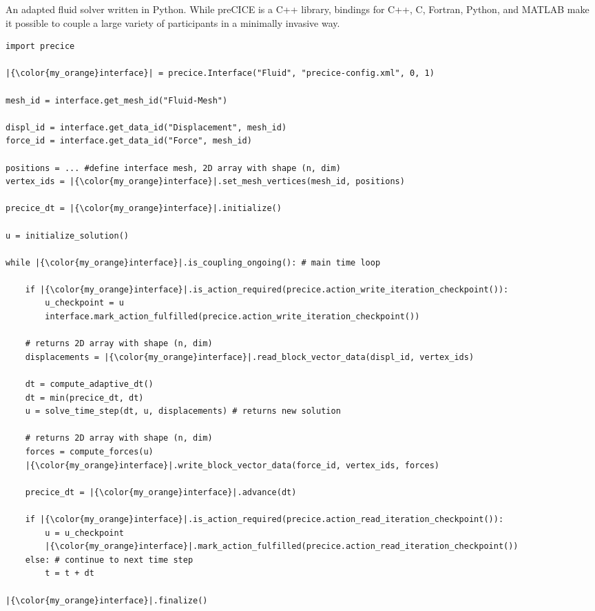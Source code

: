 \begin{listing}[h!]
\caption{An adapted fluid solver written in Python. While preCICE is a C++ library, bindings for C++, C, Fortran, Python, and MATLAB make it possible to couple a large variety of participants in a minimally invasive way.}
\small
\label{code:example}
\begin{verbatim}
import precice

|{\color{my_orange}interface}| = precice.Interface("Fluid", "precice-config.xml", 0, 1)

mesh_id = interface.get_mesh_id("Fluid-Mesh")

displ_id = interface.get_data_id("Displacement", mesh_id)
force_id = interface.get_data_id("Force", mesh_id)

positions = ... #define interface mesh, 2D array with shape (n, dim)
vertex_ids = |{\color{my_orange}interface}|.set_mesh_vertices(mesh_id, positions)

precice_dt = |{\color{my_orange}interface}|.initialize()

u = initialize_solution()

while |{\color{my_orange}interface}|.is_coupling_ongoing(): # main time loop
        
    if |{\color{my_orange}interface}|.is_action_required(precice.action_write_iteration_checkpoint()):
        u_checkpoint = u
        interface.mark_action_fulfilled(precice.action_write_iteration_checkpoint())    

    # returns 2D array with shape (n, dim)
    displacements = |{\color{my_orange}interface}|.read_block_vector_data(displ_id, vertex_ids)

    dt = compute_adaptive_dt() 
    dt = min(precice_dt, dt)
    u = solve_time_step(dt, u, displacements) # returns new solution
    
    # returns 2D array with shape (n, dim)
    forces = compute_forces(u) 
    |{\color{my_orange}interface}|.write_block_vector_data(force_id, vertex_ids, forces)
    
    precice_dt = |{\color{my_orange}interface}|.advance(dt)

    if |{\color{my_orange}interface}|.is_action_required(precice.action_read_iteration_checkpoint()):
        u = u_checkpoint
        |{\color{my_orange}interface}|.mark_action_fulfilled(precice.action_read_iteration_checkpoint())
    else: # continue to next time step 
        t = t + dt    

|{\color{my_orange}interface}|.finalize()

\end{verbatim}
\end{listing}

